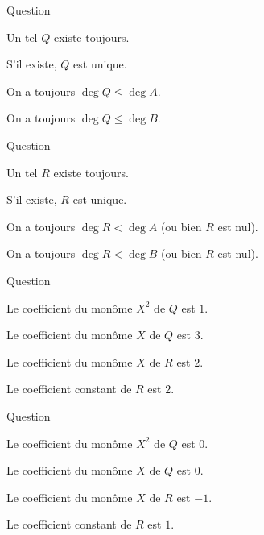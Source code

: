 \begin{multi}[multiple,feedback=
{La division euclidienne \(A = B \times Q + R\) existe toujours, \(Q\) et \(R\) sont uniques et bien sûr \(\deg Q \le \deg A\).
}]{Question}
    \item* Un tel \(Q\) existe toujours.
    \item* S'il existe, \(Q\) est unique.
    \item* On a toujours \(\deg Q \le \deg A\).
    \item On a toujours \(\deg Q \le \deg B\).
\end{multi}


\begin{multi}[multiple,feedback=
{La division euclidienne \(A = B \times Q + R\) existe toujours, \(Q\) et \(R\) sont uniques et par définition de la division euclidienne \(R\) est nul ou bien 
\(\deg R < \deg B\).
}]{Question}
    \item* Un tel \(R\) existe toujours.
    \item* S'il existe, \(R\) est unique.
    \item On a toujours \(\deg R < \deg A\) (ou bien \(R\) est nul).
    \item* On a toujours \(\deg R < \deg B\) (ou bien \(R\) est nul).
\end{multi}


\begin{multi}[multiple,feedback=
{Faire le calcul !
\(Q(X) = 2X^2-3X-1\), \(R(X) = 4X+2\).
}]{Question}
    \item Le coefficient du monôme \(X^2\) de \(Q\) est \(1\).
    \item Le coefficient du monôme \(X\) de \(Q\) est \(3\).
    \item Le coefficient du monôme \(X\) de \(R\) est \(2\).
    \item* Le coefficient constant de \(R\) est \(2\).
\end{multi}


\begin{multi}[multiple,feedback=
{Faire le calcul !
\(Q(X) = X^3-2X^2+4\), \(R(X) = -X^2+1\).
}]{Question}
    \item Le coefficient du monôme \(X^2\) de \(Q\) est \(0\).
    \item* Le coefficient du monôme \(X\) de \(Q\) est \(0\).
    \item Le coefficient du monôme \(X\) de \(R\) est \(-1\).
    \item* Le coefficient constant de \(R\) est \(1\).
\end{multi}


